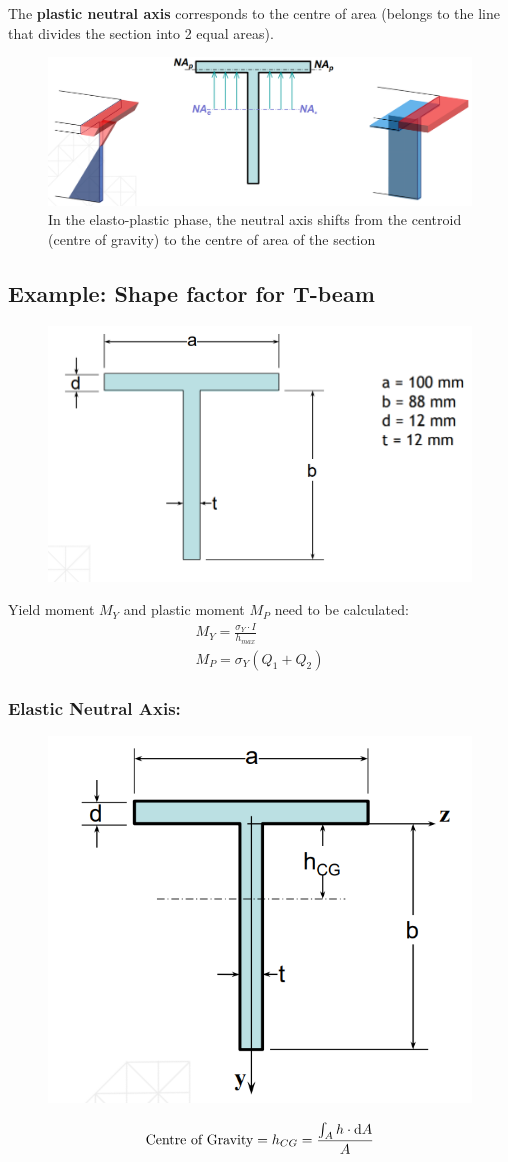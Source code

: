 \documentclass[class=report, crop=false, 12pt,a4paper]{standalone}
\begin{document}
The \textbf{plastic neutral axis} corresponds to the centre of area (belongs to the line that divides the section into 2 equal areas).
\begin{figure}[H]
  \centering
  \includegraphics[width = 0.9 \textwidth]{../img/beam20.PNG}
  \caption{In the elasto-plastic phase, the neutral axis shifts from the centroid (centre of gravity) to the centre of area of the section}
\end{figure}
\subsection{Example: Shape factor for T-beam}
\begin{figure}[H]
  \centering
  \includegraphics[width = 0.5 \textwidth]{../img/diagram3.PNG}
\end{figure}
Yield moment $M_Y$ and plastic moment $M_P$ need to be calculated:
\begin{gather}
  M_Y = \frac{\sigma_Y\cdot I}{h_{max}} \\
  M_P = \sigma_Y(Q_1+Q_2)
\end{gather}
\subsubsection{Elastic Neutral Axis:}
\begin{figure}[H]
  \centering
  \includegraphics[width = 0.4 \textwidth]{../img/diagram4.PNG}
\end{figure}
\begin{gather}
  \text{Centre of Gravity} = h_{CG} = \frac{\int_{A}h\cdot\dif A}{A}
\end{gather}
\end{document}
